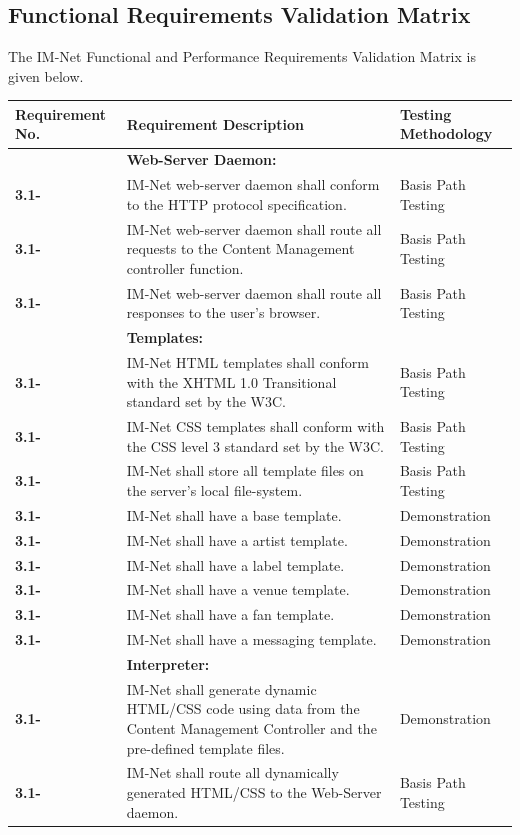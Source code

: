 \documentclass[letterpaper,12pt]{article}
\newcounter{rcounter}							%
\newcommand\rnumber{\stepcounter{rcounter}\arabic{rcounter}}
\begin{document}
{ 
\textcolor{subsection}{\subsection{Functional Requirements Validation Matrix}}
The IM-Net Functional and Performance Requirements Validation Matrix is given below.

\begin{center}
\begin{tabular}{|l|p{4in}|p{2in}|}
\hline 
Requirement No. & Requirement Description  & Testing Methodology \\ 
\hline
& \textbf{Web-Server Daemon:} & \\
\hline
\textbf{3.1-\rnumber} & IM-Net web-server daemon shall conform to the HTTP protocol specification. & Basis Path Testing \\ 
\hline 
\textbf{3.1-\rnumber} & IM-Net web-server daemon shall route all requests to the Content Management controller function. & Basis Path Testing \\ 
\hline 
\textbf{3.1-\rnumber} & IM-Net web-server daemon shall route all responses to the user's browser. & Basis Path Testing \\ 
\hline  
& \textbf{Templates:} & \\
\hline
\textbf{3.1-\rnumber} & IM-Net HTML templates shall conform with the XHTML 1.0 Transitional standard set by the W3C. & Basis Path Testing \\ 
\hline 
\textbf{3.1-\rnumber} & IM-Net CSS templates shall conform with the CSS level 3 standard set by the W3C. & Basis Path Testing \\ 
\hline 
\textbf{3.1-\rnumber} & IM-Net shall store all template files on the server's local file-system. & Basis Path Testing \\
\hline
\textbf{3.1-\rnumber} & IM-Net shall have a base template. & Demonstration \\ 
\hline 
\textbf{3.1-\rnumber} & IM-Net shall have a artist template. & Demonstration \\ 
\hline 
\textbf{3.1-\rnumber} & IM-Net shall have a label template. & Demonstration \\ 
\hline 
\textbf{3.1-\rnumber} & IM-Net shall have a venue template. & Demonstration \\ 
\hline 
\textbf{3.1-\rnumber} & IM-Net shall have a fan template. & Demonstration \\ 
\hline 
\textbf{3.1-\rnumber} & IM-Net shall have a messaging template. & Demonstration \\ 
\hline 
& \textbf{Interpreter:} & \\
\hline
\textbf{3.1-\rnumber} & IM-Net shall generate dynamic HTML/CSS code using data from the Content Management Controller and the pre-defined template files. & Demonstration \\ 
\hline 
\textbf{3.1-\rnumber} & IM-Net shall route all dynamically generated HTML/CSS to the Web-Server daemon. &  Basis Path Testing \\ 
\hline 


\end{tabular}
\end{center}}
\end{document}
